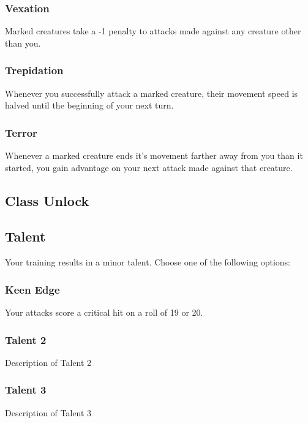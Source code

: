 \subsubsection{Vexation}
Marked creatures take a -1 penalty to attacks made against any creature other than you.

\subsubsection{Trepidation}
Whenever you successfully attack a marked creature, their movement speed is halved until the beginning of your next turn.

\subsubsection{Terror}
Whenever a marked creature ends it's movement farther away from you than it started, you gain advantage on your next attack made against that creature.

\vspace{.1 in}

\subsection*{Class Unlock}
\lipsum[1]

\vspace{.1 in}

\subsection*{Talent}
Your training results in a minor talent. Choose one of the following options:

\subsubsection{Keen Edge}
Your attacks score a critical hit on a roll of 19 or 20.

\subsubsection{Talent 2}
Description of Talent 2

\subsubsection{Talent 3}
Description of Talent 3

\vspace{.1 in}

